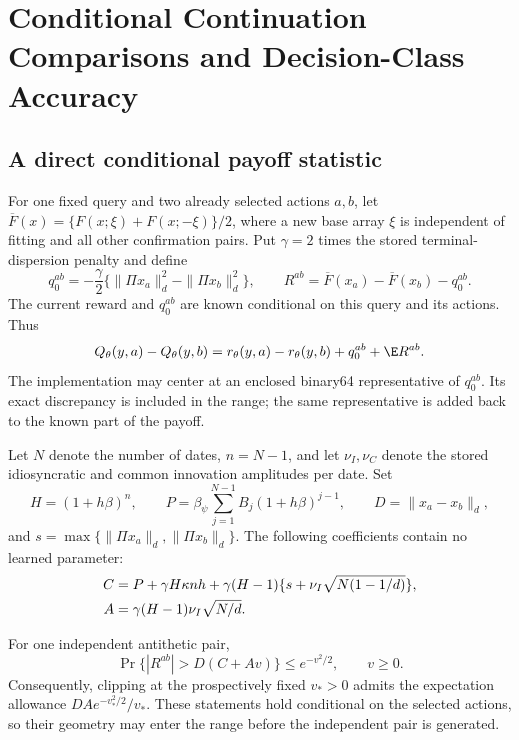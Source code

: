 \section{Conditional Continuation Comparisons and Decision-Class Accuracy}
\subsection{A direct conditional payoff statistic}
\label{app:r16menustatistic}

For one fixed query and two already selected actions $a,b$, let
$\overline F(x)=\{F(x;\xi)+F(x;-\xi)\}/2$, where a new base array
$\xi$ is independent of fitting and all other confirmation pairs. Put
$\gamma=2$ times the stored terminal-dispersion penalty and define
\[
 q_0^{ab}=-\frac\gamma2
       \{\|\Pi x_a\|_d^2-\|\Pi x_b\|_d^2\},\qquad
 R^{ab}=\overline F(x_a)-\overline F(x_b)-q_0^{ab}.
\]
The current reward and $q_0^{ab}$ are known conditional on this query
and its actions. Thus
\begin{equation}
 Q_\theta(y,a)-Q_\theta(y,b)
       =r_\theta(y,a)-r_\theta(y,b)+q_0^{ab}+\E R^{ab}.
 \label{eq:r16menucentered}
\end{equation}
The implementation may center at an enclosed binary64 representative of
$q_0^{ab}$. Its exact discrepancy is included in the range; the same
representative is added back to the known part of the payoff.

Let $N$ denote the number of dates, $n=N-1$, and let $\nu_I,\nu_C$
denote the stored idiosyncratic and common innovation amplitudes per
date. Set
\[
 H=(1+h\beta)^n,\qquad
 P=\beta_\psi\sum_{j=1}^{N-1}B_j(1+h\beta)^{j-1},\qquad
 D=\|x_a-x_b\|_d,
\]
and $s=\max\{\|\Pi x_a\|_d,\|\Pi x_b\|_d\}$. The following
coefficients contain no learned parameter:
\begin{align}
 C&=P+\gamma H\kappa nh
       +\gamma(H-1)\{s+\nu_I\sqrt{N(1-1/d)}\},\notag\\
 A&=\gamma(H-1)\nu_I\sqrt{N/d}.
 \label{eq:r16menuconstants}
\end{align}

\begin{proposition}
\label{prop:r16menurange}
For one independent antithetic pair,
\[
 \Pr\{|R^{ab}|>D(C+Av)\}\leq e^{-v^2/2},\qquad v\geq0.
\]
Consequently, clipping at the prospectively fixed $v_*>0$ admits
the expectation allowance $DAe^{-v_*^2/2}/v_*$. These statements
hold conditional on the selected actions, so their geometry may enter
the range before the independent pair is generated.
\end{proposition}

